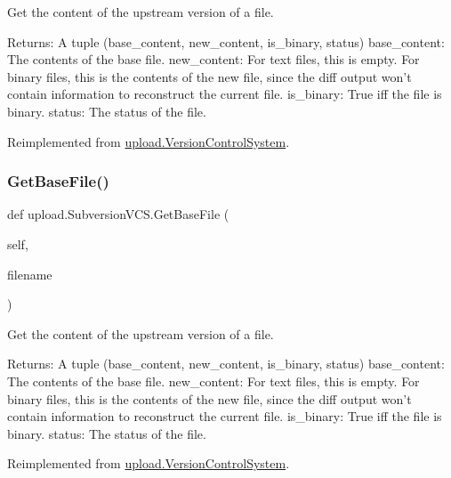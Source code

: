 \begin{DoxyVerb}Get the content of the upstream version of a file.

Returns:
  A tuple (base_content, new_content, is_binary, status)
base_content: The contents of the base file.
new_content: For text files, this is empty.  For binary files, this is
  the contents of the new file, since the diff output won't contain
  information to reconstruct the current file.
is_binary: True iff the file is binary.
status: The status of the file.
\end{DoxyVerb}
 

Reimplemented from \mbox{\hyperlink{classupload_1_1VersionControlSystem_adfd9d4ecba422102233a2ba13e5bfaf5}{upload.\+Version\+Control\+System}}.

\mbox{\label{classupload_1_1SubversionVCS_a29dec4941de0824734d6842a2f33ffc3}} 
\subsubsection{\texorpdfstring{GetBaseFile()}{GetBaseFile()}\hspace{0.1cm}{\footnotesize\ttfamily [2/2]}}
{\footnotesize\ttfamily def upload.\+Subversion\+V\+C\+S.\+Get\+Base\+File (\begin{DoxyParamCaption}\item[{}]{self,  }\item[{}]{filename }\end{DoxyParamCaption})}

\begin{DoxyVerb}Get the content of the upstream version of a file.

Returns:
  A tuple (base_content, new_content, is_binary, status)
base_content: The contents of the base file.
new_content: For text files, this is empty.  For binary files, this is
  the contents of the new file, since the diff output won't contain
  information to reconstruct the current file.
is_binary: True iff the file is binary.
status: The status of the file.
\end{DoxyVerb}
 

Reimplemented from \mbox{\hyperlink{classupload_1_1VersionControlSystem_adfd9d4ecba422102233a2ba13e5bfaf5}{upload.\+Version\+Control\+System}}.

\mbox{\label{classupload_1_1SubversionVCS_ac3785eb1fa561088206d01570f9fe982}} 
